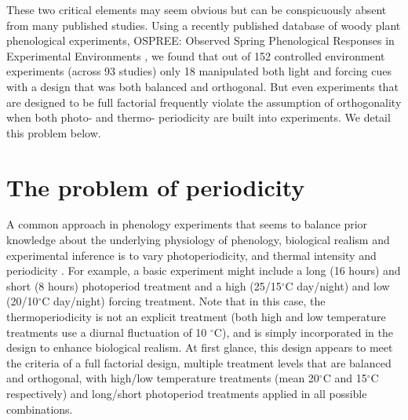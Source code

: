 \documentclass[11pt]{article}
\begin{document}
These two critical elements may seem obvious but can be conspicuously absent from many published studies.  Using a recently published database of woody plant phenological experiments, OSPREE: Observed Spring Phenological Responses in Experimental Environments \citep{wolkovich2019}, we found that out of 152 controlled environment experiments (across 93 studies) only 18 manipulated both light and forcing cues with a design that was both balanced and orthogonal. But even experiments that are designed to be full factorial frequently violate the assumption of orthogonality when both photo- and thermo- periodicity are built into experiments. We detail this problem below.

\section*{The problem of periodicity}
A common approach in phenology experiments that seems to balance prior knowledge about the underlying physiology of phenology, biological realism and experimental inference is to vary photoperiodicity, and thermal intensity and periodicity \citep[e.g.][]{Flynn2018,Sanz-Perez:2009aa,Basler:2014aa}. For example, a basic experiment might include a long (16 hours) and short (8 hours) photoperiod treatment and a high (25/15$^{\circ}$C day/night) and low (20/10$^{\circ}$C day/night) forcing treatment. Note that in this case, the thermoperiodicity is not an explicit treatment (both high and low temperature treatments use a diurnal fluctuation of 10 $^{\circ}$C), and is simply incorporated in the design to enhance biological realism. At first glance, this design appears to meet the criteria of a full factorial design, multiple treatment levels that are balanced and orthogonal, with high/low temperature treatments (mean 20$^{\circ}$C and 15$^{\circ}$C respectively) and long/short photoperiod treatments applied in all possible combinations.
\end{document}
